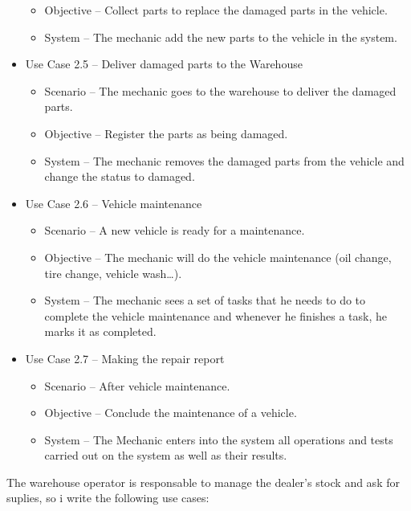 \begin{itemize}
\begin{itemize}
      \item Objective – Collect parts to replace the damaged parts in the vehicle.
      \item System – The mechanic add the new parts to the vehicle in the system.
    \end{itemize}
    \item Use Case 2.5 – Deliver damaged parts to the Warehouse
    \begin{itemize}
      \item Scenario – The mechanic goes to the warehouse to deliver the damaged parts.
      \item Objective – Register the parts as being damaged.
      \item System – The mechanic removes the damaged parts from the vehicle and change the status to damaged.
    \end{itemize}
\item Use Case 2.6 – Vehicle maintenance
\begin{itemize}
  \item Scenario – A new vehicle is ready for a maintenance.
  \item Objective – The mechanic will do the vehicle maintenance (oil change, tire change, vehicle wash…).
  \item System – The mechanic sees a set of tasks that he needs to do to complete the vehicle maintenance and whenever he finishes a task, he marks it as completed.
\end{itemize}
\item Use Case 2.7 – Making the repair report
\begin{itemize}
  \item Scenario – After vehicle maintenance.
  \item Objective – Conclude the maintenance of a vehicle.
  \item System – The Mechanic enters into the system all operations and tests carried out on the system as well as their results.
\end{itemize}
\end{itemize}
\hfill \break

The warehouse operator is responsable to manage the dealer's stock and ask for suplies, so i write the following use cases:

